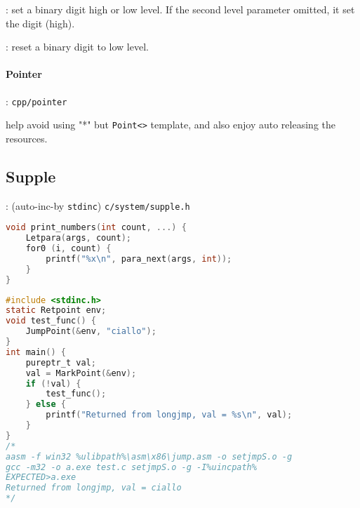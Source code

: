 : set a binary digit high or low level. If the second level parameter omitted, it set the digit (high).

: reset a binary digit to low level.

\paragraph{Pointer}

: \verb`cpp/pointer`

help avoid using "*" but \verb`Point<>` template, and also enjoy auto releasing the resources.

\subsection{Supple}

: (auto-inc-by \verb`stdinc`) \verb`c/system/supple.h`


\begin{lstlisting}[language=C]
void print_numbers(int count, ...) {
	Letpara(args, count);
	for0 (i, count) {
		printf("%x\n", para_next(args, int));
	}
}
\end{lstlisting}


\begin{lstlisting}[language=C]
#include <stdinc.h>
static Retpoint env;
void test_func() {
	JumpPoint(&env, "ciallo");
}
int main() {
	pureptr_t val;
	val = MarkPoint(&env);
	if (!val) {
		test_func();
	} else {
		printf("Returned from longjmp, val = %s\n", val);
	}
}
/*
aasm -f win32 %ulibpath%\asm\x86\jump.asm -o setjmpS.o -g
gcc -m32 -o a.exe test.c setjmpS.o -g -I%uincpath%
EXPECTED>a.exe
Returned from longjmp, val = ciallo
*/
\end{lstlisting}
